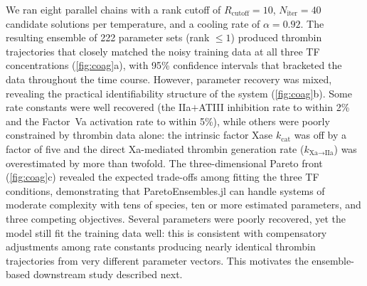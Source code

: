 \documentclass[preprint,review,12pt]{elsarticle}
\begin{document}
We ran eight parallel chains with a rank cutoff of $R_{\text{cutoff}} = 10$, $N_{\text{iter}} = 40$ candidate solutions per temperature, and a cooling rate of $\alpha = 0.92$. The resulting ensemble of 222 parameter sets (rank $\leq 1$) produced thrombin trajectories that closely matched the noisy training data at all three TF concentrations (\cref{fig:coag}a), with 95\% confidence intervals that bracketed the data throughout the time course. However, parameter recovery was mixed, revealing the practical identifiability structure of the system (\cref{fig:coag}b). Some rate constants were well recovered (the IIa$+$ATIII inhibition rate to within 2\% and the Factor~Va activation rate to within 5\%), while others were poorly constrained by thrombin data alone: the intrinsic factor Xase $k_{\text{cat}}$ was off by a factor of five and the direct Xa-mediated thrombin generation rate ($k_{\text{Xa} \to \text{IIa}}$) was overestimated by more than twofold. The three-dimensional Pareto front (\cref{fig:coag}c) revealed the expected trade-offs among fitting the three TF conditions, demonstrating that ParetoEnsembles.jl can handle systems of moderate complexity with tens of species, ten or more estimated parameters, and three competing objectives. Several parameters were poorly recovered, yet the model still fit the training data well: this is consistent with compensatory adjustments among rate constants producing nearly identical thrombin trajectories from very different parameter vectors. This motivates the ensemble-based downstream study described next.
\end{document}
